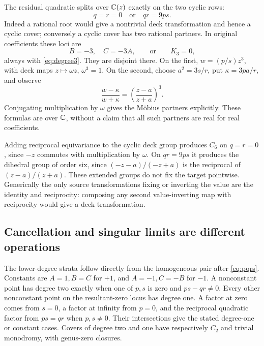 The residual quadratic splits over \(\mathbb C(z)\) exactly on the two cyclic rows:
\begin{equation}\label{eq:cyclic_loci}
 q=r=0\quad\text{or}\quad qr=9ps.
\end{equation}
Indeed a rational root would give a nontrivial deck transformation and hence a cyclic cover; conversely a cyclic cover has two rational partners. In original coefficients these loci are
\begin{equation}\label{eq:cyclic_ABC}
 B=-3,\quad C=-3A,\qquad\text{or}\qquad K_3=0,
\end{equation}
always with \eqref{eq:degree3}. They are disjoint there. On the first, \(w=(p/s)z^3\), with deck maps \(z\mapsto\omega z\), \(\omega^3=1\). On the second, choose \(a^2=3s/r\), put \(\kappa=3pa/r\), and observe
\begin{equation}\label{eq:cyclic_conjugacy}
 \frac{w-\kappa}{w+\kappa}=\left(\frac{z-a}{z+a}\right)^3.
\end{equation}
Conjugating multiplication by \(\omega\) gives the Möbius partners explicitly. These formulas are over \(\mathbb C\), without a claim that all such partners are real for real coefficients.

Adding reciprocal equivariance to the cyclic deck group produces \(C_6\) on \(q=r=0\), since \(-z\) commutes with multiplication by \(\omega\). On \(qr=9ps\) it produces the dihedral group of order six, since \(({-z}-a)/({-z}+a)\) is the reciprocal of \((z-a)/(z+a)\). These extended groups do not fix the target pointwise. Generically the only source transformations fixing or inverting the value are the identity and reciprocity: composing any second value-inverting map with reciprocity would give a deck transformation.

\subsection{Cancellation and singular limits are different operations}
The lower-degree strata follow directly from the homogeneous pair after \eqref{eq:pqrs}. Constants are \(A=1,B=C\) for \(+1\), and \(A=-1,C=-B\) for \(-1\). A nonconstant point has degree two exactly when one of \(p,s\) is zero and \(ps-qr\ne0\). Every other nonconstant point on the resultant-zero locus has degree one. A factor at zero comes from \(s=0\), a factor at infinity from \(p=0\), and the reciprocal quadratic factor from \(ps=qr\) when \(p,s\ne0\). Their intersections give the stated degree-one or constant cases. Covers of degree two and one have respectively \(C_2\) and trivial monodromy, with genus-zero closures.


